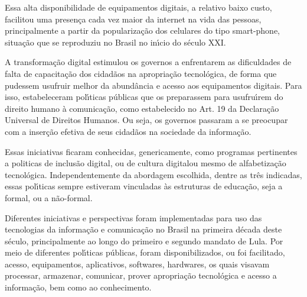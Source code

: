 \documentclass[
12pt,		%
openright,	%
twoside,  %
a4paper,			%
chapter=TITLE,		%
english,			%
french,				%
spanish,			%
brazil				%
]{USPSC-classe/USPSC}
\begin{document}
Essa alta disponibilidade de equipamentos digitais, a relativo baixo custo, facilitou uma presen\c{c}a cada vez maior da internet na vida das pessoas, principalmente a partir da populariza\c{c}\~ao dos celulares do tipo \textquotedbl smart-phone\textquotedbl , situa\c{c}\~ao que se reproduziu no Brasil no in\'{\i}cio do s\'eculo XXI.









A transforma\c{c}\~ao digital estimulou os governos a enfrentarem as dificuldades  de falta de  capacita\c{c}\~ao dos cidad\~aos na apropria\c{c}\~ao tecnol\'ogica, de forma que pudessem usufruir melhor da abund\^ancia e acesso aos equipamentos digitais. Para isso, estabeleceram pol\'{\i}ticas p\'ublicas que os preparassem para usufru\'{\i}rem do direito humano \`a comunica\c{c}\~ao, como estabelecido no Art. 19 da Declara\c{c}\~ao Universal de Direitos Humanos. Ou seja, os governos passaram a se preocupar com a inser\c{c}\~ao efetiva de seus cidad\~aos na sociedade da informa\c{c}\~ao.









Essas iniciativas ficaram conhecidas, genericamente, como programas pertinentes a politicas de \textquotedbl inclus\~ao digital, ou  de \textquotedbl cultura digital\textquotedbl  ou mesmo de \textquotedbl alfabetiza\c{c}\~ao tecnol\'ogica\textquotedbl . Independentemente da abordagem escolhida, dentre as tr\^es indicadas, essas pol\'{\i}ticas sempre estiveram vinculadas \`as estruturas de educa\c{c}\~ao, seja a formal, ou a n\~ao-formal.









Diferentes iniciativas e perspectivas foram implementadas para uso das tecnologias da informa\c{c}\~ao e comunica\c{c}\~ao no Brasil na primeira d\'ecada deste s\'eculo, principalmente ao longo do primeiro e segundo mandato de Lula. Por meio de diferentes pol\'{\i}ticas p\'ublicas, foram disponibilizados, ou foi facilitado, acesso, equipamentos, aplicativos, softwares, hardwares, os quais visavam processar, armazenar, comunicar, prover apropria\c{c}\~ao tecnol\'ogica e acesso a  informa\c{c}\~ao, bem como ao conhecimento.
\end{document}
